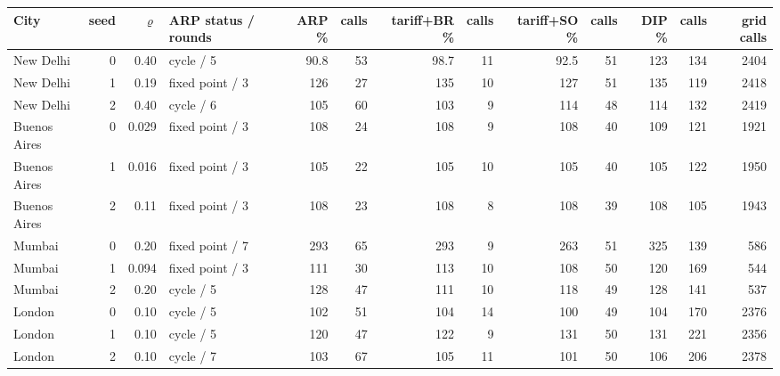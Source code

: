 \begin{tabular}{lrrlrrrrrrrrr}
\toprule
City & seed & $\varrho$ & ARP status / rounds & ARP \% & calls & tariff+BR \% & calls & tariff+SO \% & calls & DIP \% & calls & grid calls \\
\midrule
New Delhi & 0 & 0.40 & cycle / 5 & 90.8 & 53 & 98.7 & 11 & 92.5 & 51 & 123 & 134 & 2404 \\
New Delhi & 1 & 0.19 & fixed point / 3 & 126 & 27 & 135 & 10 & 127 & 51 & 135 & 119 & 2418 \\
New Delhi & 2 & 0.40 & cycle / 6 & 105 & 60 & 103 & 9 & 114 & 48 & 114 & 132 & 2419 \\
Buenos Aires & 0 & 0.029 & fixed point / 3 & 108 & 24 & 108 & 9 & 108 & 40 & 109 & 121 & 1921 \\
Buenos Aires & 1 & 0.016 & fixed point / 3 & 105 & 22 & 105 & 10 & 105 & 40 & 105 & 122 & 1950 \\
Buenos Aires & 2 & 0.11 & fixed point / 3 & 108 & 23 & 108 & 8 & 108 & 39 & 108 & 105 & 1943 \\
Mumbai & 0 & 0.20 & fixed point / 7 & 293 & 65 & 293 & 9 & 263 & 51 & 325 & 139 & 586 \\
Mumbai & 1 & 0.094 & fixed point / 3 & 111 & 30 & 113 & 10 & 108 & 50 & 120 & 169 & 544 \\
Mumbai & 2 & 0.20 & cycle / 5 & 128 & 47 & 111 & 10 & 118 & 49 & 128 & 141 & 537 \\
London & 0 & 0.10 & cycle / 5 & 102 & 51 & 104 & 14 & 100 & 49 & 104 & 170 & 2376 \\
London & 1 & 0.10 & cycle / 5 & 120 & 47 & 122 & 9 & 131 & 50 & 131 & 221 & 2356 \\
London & 2 & 0.10 & cycle / 7 & 103 & 67 & 105 & 11 & 101 & 50 & 106 & 206 & 2378 \\
\bottomrule
\end{tabular}
